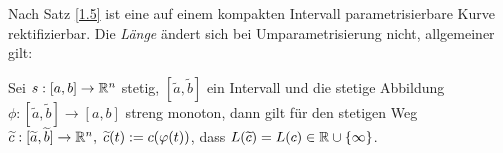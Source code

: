 \documentclass[11pt]{scrbook}
\begin{document}
Nach Satz \ref{1.5} ist eine auf einem kompakten Intervall parametrisierbare Kurve rektifizierbar. Die \emph{Länge} ändert sich bei Umparametrisierung nicht, allgemeiner gilt:
\begin{st}
Sei $s: [a,b] \to \mathbb{R}^n$ stetig, $[\tilde a, \tilde b]$ ein Intervall und die stetige Abbildung $\phi: [\tilde a, \tilde b] \to [a,b]$ streng monoton, dann gilt für den stetigen Weg $\widetilde c: [\widetilde a, \widetilde b] \to \mathbb{R}^n, \; \widetilde c(t) := c(\varphi(t))$, dass $L(\widetilde c) = L(c) \in \mathbb{R} \cup \{ \infty \}$.
\end{st}
\end{document}
